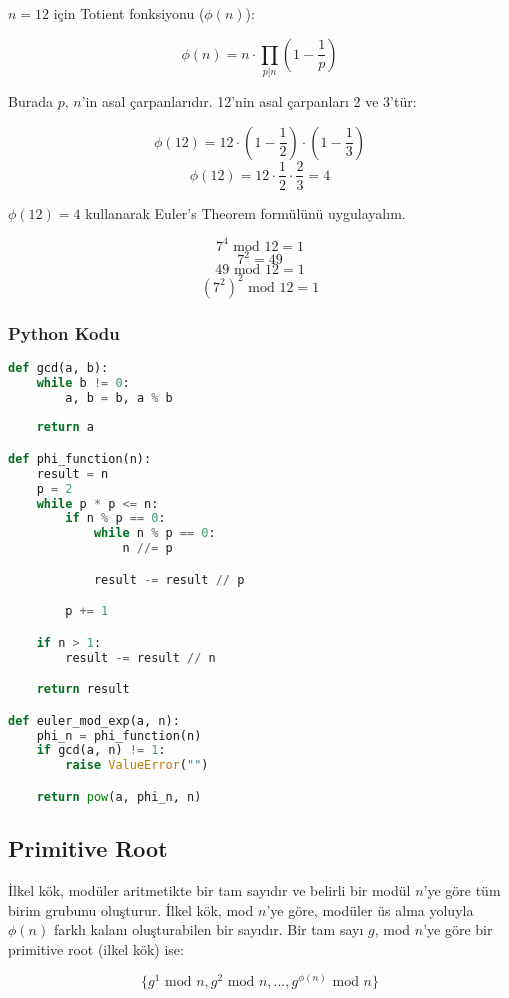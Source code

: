 $n = 12$ için Totient fonksiyonu ($\phi(n)$):

\[ \phi(n) = n \cdot \prod_{p | n} (1 - \frac{1}{p}) \]

Burada $p$, $n$'in asal çarpanlarıdır. 12'nin asal çarpanları 2 ve 3'tür:

\[ \phi(12) = 12 \cdot (1 - \frac{1}{2}) \cdot (1 - \frac{1}{3}) \]
\[ \phi(12) = 12 \cdot \frac{1}{2} \cdot \frac{2}{3} = 4\]

$\phi(12) = 4$ kullanarak Euler's Theorem formülünü uygulayalım.

\[ 7^4 \text{ mod } 12 = 1 \]
\[ 7^2 = 49\]
\[ 49 \text{ mod } 12 = 1 \]
\[ (7^2)^2 \text{ mod } 12 = 1 \]

\subsubsection{Python Kodu}

\begin{lstlisting}[language=Python]
def gcd(a, b):
    while b != 0:
        a, b = b, a % b
        
    return a

def phi_function(n):
    result = n
    p = 2
    while p * p <= n:
        if n % p == 0:
            while n % p == 0:
                n //= p

            result -= result // p

        p += 1

    if n > 1:
        result -= result // n

    return result

def euler_mod_exp(a, n):
    phi_n = phi_function(n)
    if gcd(a, n) != 1:
        raise ValueError("")

    return pow(a, phi_n, n)
\end{lstlisting}

\newpage

\subsection{Primitive Root}

İlkel kök, modüler aritmetikte bir tam sayıdır ve belirli bir modül $n$'ye göre tüm birim grubunu oluşturur. İlkel kök, mod $n$'ye göre, modüler üs alma yoluyla $\phi(n)$ farklı kalanı oluşturabilen bir sayıdır. Bir tam sayı $g$, mod $n$'ye göre bir primitive root (ilkel kök) ise:

\[ \{ g^1 \text{ mod } n, g^2 \text{ mod } n, ..., g^{\phi(n)} \text{ mod } n \} \]

